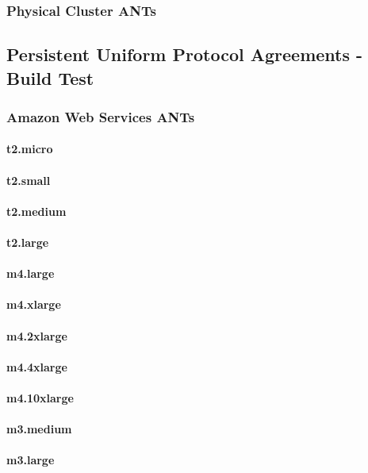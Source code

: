 \documentclass{acm_proc_article-sp}
\begin{document}
\subsubsection{Physical Cluster ANTs}
\subsection{Persistent Uniform Protocol Agreements - Build Test}
\subsubsection{Amazon Web Services ANTs}
\paragraph{t2.micro}
\paragraph{t2.small}
\paragraph{t2.medium}
\paragraph{t2.large}
\paragraph{m4.large}
\paragraph{m4.xlarge}
\paragraph{m4.2xlarge}
\paragraph{m4.4xlarge}
\paragraph{m4.10xlarge}
\paragraph{m3.medium}
\paragraph{m3.large}
\end{document}
